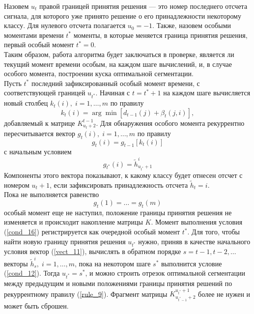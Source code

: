 \documentclass[12pt,a4paper]{article}
\begin{document}
Назовем $u_t$ правой границей принятия решения --- это номер последнего отсчета сигнала, для которого уже принято решение о его принадлежности некоторому классу. Для нулевого отсчета полагается $u_0 = -1.$ Также, назовем особыми моментами времени $t^*$ моменты, в которые меняется граница принятия решения, первый особый момент $t^* = 0.$\\ Таким образом, работа алгоритма будет заключаться в проверке, является ли текущий момент времени особым, на каждом шаге вычислений, и, в случае особого момента, построении куска оптимальной сегментации.\\

Пусть $t^*$ последний зафиксированный особый момент времени, с соответствующей границей $u_{t^*}$. Начиная с $t = t^* +1$ на каждом шаге вычисляется новый столбец $k_t(i),\; i = 1,\dots,m$ по правилу
$$k_t(i) = \arg\min[d_{t-1}(j)+\beta_t(j,i)],$$
добавляемый к матрице $K_{u_t+2}^{t-1}$. Для обнаружения особого момента рекуррентно пересчитывается вектор $g_t(i),\; i =1,\dots,m$ по правилу
$$g_t(i) = g_{t-1}[k_t(i)]$$ с начальным условием
$$g_{t^*}(i) = \tilde{h}_{u_{t^*}+1}^i$$
Компоненты этого вектора показывают, к какому классу будет отнесен отсчет с номером $u_t + 1$, если зафиксировать принадлежность отсчета $\tilde{h}_t=i.$\\
Пока не выполняется равенство
\begin{equation}
\label{cond_16}
g_t(1) = \dots = g_t(m)
\end{equation}
особый момент еще не наступил, положение границы принятия решения не изменяется и происходит накопление матрицы $K.$ Момент выполнения условия (\ref{cond_16}) регистрируется как очередной особый момент $t^*$. Для того, чтобы найти новую границу принятия решения $u_{t^*}$ нужно, приняв в качестве начального условия вектор (\ref{vect_11}), вычислять в обратном порядке $s = t-1, t-2,\dots$ векторы $\tilde{h}_s^i,\; i = 1,\dots, m$, пока на некотором шаге $s^*$ выполнится условие (\ref{cond_12}). Тогда $u_{t^*} = s^*$, и можно строить отрезок оптимальной сегментации между предыдущим и новыми положениями границы принятия решений по рекуррентному правилу (\ref{rule_9}). Фрагмент матрицы $K_{u_{t^*-1}+2}^{u_{t^*}+1}$ более не нужен и может быть сброшен.

\end{document}
